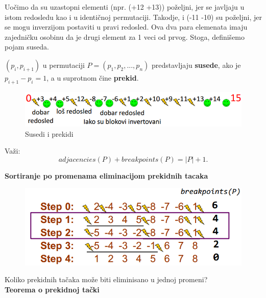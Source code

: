 \hspace{0.7cm}Uočimo da su uzastopni elementi (npr. (+12 +13)) poželjni, jer se javljaju u istom redosledu kao i u identičnoj permutaciji. Takodje, i (-11 -10) su poželjni, jer se mogu inverzijom postaviti u pravi redosled. Ova dva para elemenata imaju zajedničku osobinu da je drugi element za 1 veci od prvog. Stoga, definišemo pojam suseda.

\begin{definicija}{$(p_i, p_{i+1})$ u permutaciji $P = (p_1, p_2, ..., p_n)$ predstavljaju \textbf{susede}, ako je $p_{i+1} - p_i = 1$, a u suprotnom čine \textbf{prekid}.}
\end{definicija}

\begin{figure}[h!]
\centering
\includegraphics[scale=0.75]{poglavlja/6/slike/dobar_los.PNG}
\caption{Susedi i prekidi}
\label{slika:X}
\end{figure}

Važi:\\
$$ adjacencies(P) + breakpoints(P) = |P| + 1.$$

\hspace{1cm}

\large{\textbf{Sortiranje po promenama eliminacijom prekidnih tacaka}}\\

\begin{figure}[h]
\centering
\includegraphics[scale=0.7]{poglavlja/6/slike/koliko.PNG}
\caption{}
\label{slika:X}
\end{figure}

\noindent Koliko prekidnih tačaka može biti eliminisano u jednoj promeni?\\

\vspace{1cm}
\hspace{2.3cm}\textbf{Teorema o prekidnoj tački}\\

